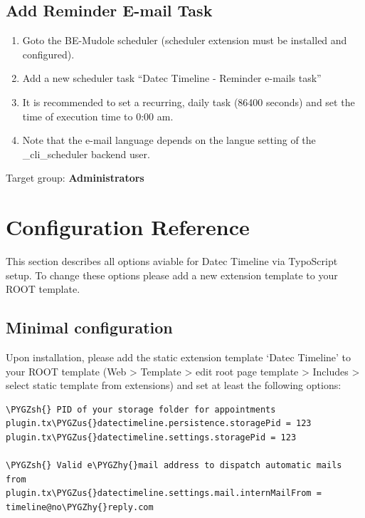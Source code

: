 \documentclass[a4paper,10pt,english]{sphinxmanual}
\def\PYGZus{\char`\_}
\def\PYGZsh{\char`\#}
\def\PYGZhy{\char`\-}
\begin{document}
\section{Add Reminder E-mail Task}
\label{AdministratorManual/Index:add-reminder-e-mail-task}\begin{enumerate}
\item {} 
Goto the BE-Mudole scheduler (scheduler extension must be installed and configured).

\item {} 
Add a new scheduler task ``Datec Timeline - Reminder e-mails task''

\item {} 
It is recommended to set a recurring, daily task (86400 seconds) and set the time of execution time to 0:00 am.

\item {} 
Note that the e-mail language depends on the langue setting of the \_cli\_scheduler backend user.

\end{enumerate}

Target group: \textbf{Administrators}


\chapter{Configuration Reference}
\label{Configuration/Index:configuration}\label{Configuration/Index::doc}\label{Configuration/Index:configuration-reference}
This section describes all options aviable for Datec Timeline via TypoScript setup. To change these options please add a new extension template to your ROOT template.


\section{Minimal configuration}
\label{Configuration/Index:configuration-typoscript}\label{Configuration/Index:minimal-configuration}
Upon installation, please add the static extension template `Datec Timeline' to your ROOT template (Web \textgreater{} Template \textgreater{} edit root page template \textgreater{} Includes \textgreater{} select static template from extensions) and set at least the following options:

\begin{Verbatim}[frame=single,commandchars=\\\{\}]
\PYGZsh{} PID of your storage folder for appointments
plugin.tx\PYGZus{}datectimeline.persistence.storagePid = 123
plugin.tx\PYGZus{}datectimeline.settings.storagePid = 123

\PYGZsh{} Valid e\PYGZhy{}mail address to dispatch automatic mails from
plugin.tx\PYGZus{}datectimeline.settings.mail.internMailFrom = timeline@no\PYGZhy{}reply.com
\end{Verbatim}
\end{document}
